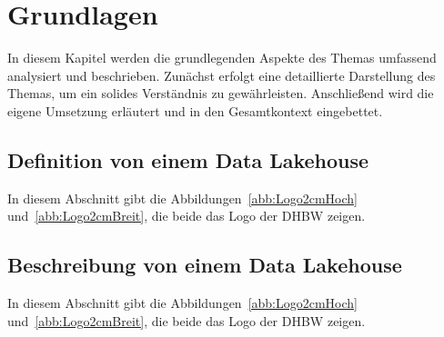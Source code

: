 \chapter{Grundlagen}\label{chapter:Grundlagen}

In diesem Kapitel werden die grundlegenden Aspekte des Themas umfassend analysiert und beschrieben. Zunächst erfolgt eine detaillierte Darstellung des Themas, um ein solides Verständnis zu gewährleisten. Anschließend wird die eigene Umsetzung erläutert und in den Gesamtkontext eingebettet.

\section{Definition von einem Data Lakehouse}
In diesem Abschnitt gibt die Abbildungen~\ref{abb:Logo2cmHoch} und~\ref{abb:Logo2cmBreit}, die beide das Logo der DHBW zeigen.

\section{Beschreibung von einem Data Lakehouse}
In diesem Abschnitt gibt die Abbildungen~\ref{abb:Logo2cmHoch} und~\ref{abb:Logo2cmBreit}, die beide das Logo der DHBW zeigen.
